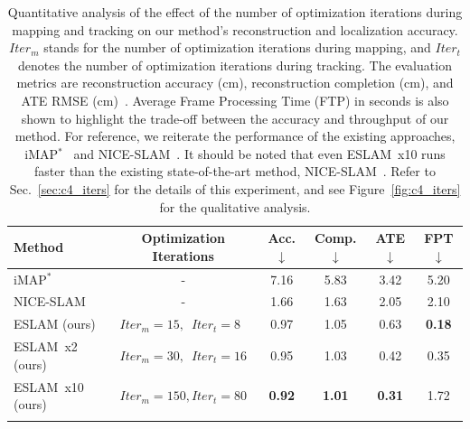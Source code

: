 \begin{table}[t]
    \begin{center}
        \begin{tabular}{l|c|ccc|c}
            \Xhline{2\arrayrulewidth}
            Method & Optimization Iterations & Acc.$\downarrow$ & Comp.$\downarrow$ & ATE$\downarrow$ & FPT$\downarrow$ \\
            
            \hline
            iMAP$^{*}$ & - & 7.16 & 5.83 & 3.42 & 5.20 \\
            NICE-SLAM & - & 1.66 & 1.63 & 2.05 & 2.10 \\
            
            \hline
            ESLAM (ours) & $Iter_{m}=15, \phantom{0} Iter_{t}=8\phantom{0}$  & 0.97 & 1.05  & 0.63 & \textbf{0.18} \\
            ESLAM~x2 (ours) & $Iter_{m}=30, \phantom{0} Iter_{t}=16$  & 0.95 & 1.03  & 0.42 & 0.35 \\
            ESLAM~x10 (ours) & $Iter_{m}=150, Iter_{t}=80$  & \textbf{0.92} & \textbf{1.01}  & \textbf{0.31} & 1.72 \\
            
            \Xhline{2\arrayrulewidth}
        \end{tabular}
    \end{center}
    \caption{Quantitative analysis of the effect of the number of optimization iterations during mapping and tracking on our method's reconstruction and localization accuracy. $Iter_{m}$ stands for the number of optimization iterations during mapping, and $Iter_{t}$ denotes the number of optimization iterations during tracking. The evaluation metrics are reconstruction accuracy (cm), reconstruction completion (cm), and ATE RMSE (cm)~\cite{sturm2012benchmark}. Average Frame Processing Time (FTP) in seconds is also shown to highlight the trade-off between the accuracy and throughput of our method. For reference, we reiterate the performance of the existing approaches, iMAP$^{*}$~\cite{sucar2021imap} and NICE-SLAM~\cite{zhu2022nice}. It should be noted that even ESLAM~x10 runs faster than the existing state-of-the-art method, NICE-SLAM~\cite{zhu2022nice}. Refer to Sec.~\ref{sec:c4_iters} for the details of this experiment, and see Figure~\ref{fig:c4_iters} for the qualitative analysis.}
    \label{table:iters}
\end{table}


